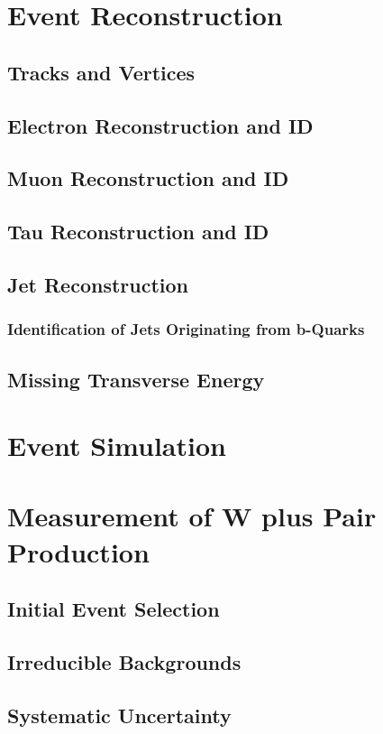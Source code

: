 \documentclass[oneside, letterpaper, 12pt, oldfontcommands]{memoir}
\begin{document}
\chapter{Event Reconstruction}
 \section{Tracks and Vertices}
 \section{Electron Reconstruction and ID}
 \section{Muon Reconstruction and ID}
 \section{Tau Reconstruction and ID}
 \section{Jet Reconstruction}
  \subsection{Identification of Jets Originating from b-Quarks}
 \section{Missing Transverse Energy}

\chapter{Event Simulation}
\chapter{Measurement of W plus \bbbar Pair Production}
\section{Initial Event Selection}
\section{Irreducible Backgrounds}
\section{Systematic Uncertainty}
\end{document}
